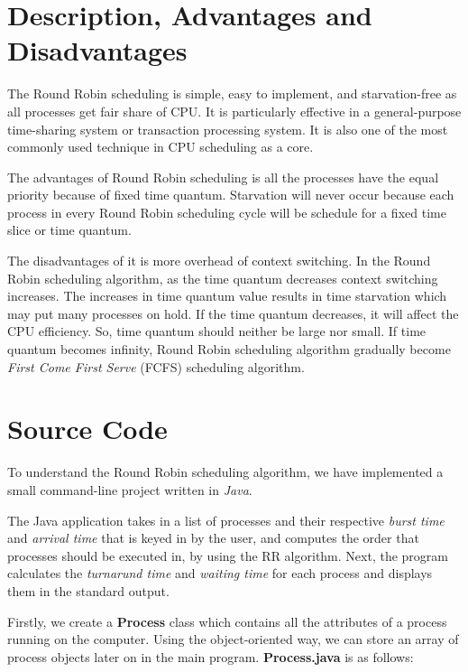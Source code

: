 \documentclass[12pt]{article}
\begin{document}
 \newpage 
 \section{Description, Advantages and Disadvantages}

The Round Robin scheduling is simple, easy to implement, and starvation-free as
all processes get fair share of CPU. It is particularly effective in a
general-purpose time-sharing system or transaction processing system. It is also
one of the most commonly used technique in CPU scheduling as a core.

The advantages of Round Robin scheduling is all the processes have the equal
priority because of fixed time quantum. Starvation will never occur because each
process in every Round Robin scheduling cycle will be schedule for a fixed time
slice or time quantum.

The disadvantages of it is more overhead of context switching. In the Round
Robin scheduling algorithm, as the time quantum decreases context switching
increases. The increases in time quantum value results in time starvation which
may put many processes on hold. If the time quantum decreases, it will affect
the CPU efficiency. So, time quantum should neither be large nor small. If time
quantum becomes infinity, Round Robin scheduling algorithm gradually become
\textit{First Come First Serve} (FCFS) scheduling algorithm.

\newpage
\section{Source Code}

To understand the Round Robin scheduling algorithm, we have implemented a small
command-line project written in \textit{Java}.

The Java application takes in a list of processes and their respective
\textit{burst time} and \textit{arrival time} that is keyed in by the user, and
computes the order that processes should be executed in, by using the RR
algorithm. Next, the program calculates the \textit{turnarund time} and
\textit{waiting time} for each process and displays them in the standard output.

Firstly, we create a \textbf{Process} class which contains all the attributes of
a process running on the computer. Using the object-oriented way, we can store
an array of process objects later on in the main program. \textbf{Process.java} is as follows:
\end{document}
